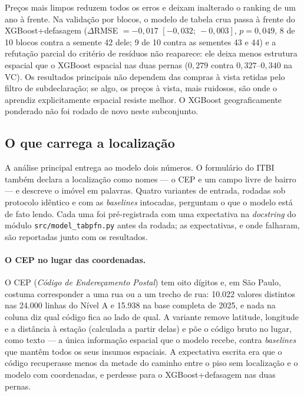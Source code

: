 \documentclass[11pt,a4paper]{article}
\begin{document}
Preços mais limpos reduzem todos os erros e deixam inalterado o ranking de um ano à frente. Na
validação por blocos, o modelo de tabela crua passa à frente do XGBoost+defasagem ($\Delta$RMSE
$= -0{,}017$ $[-0{,}032;\ -0{,}003]$, $p = 0{,}049$, 8 de 10 blocos contra a semente 42 dele;
9 de 10 contra as sementes 43 e 44) e a refutação parcial do critério de resíduos não
reaparece: ele deixa menos estrutura espacial que o XGBoost espacial nas duas pernas ($0{,}279$
contra $0{,}327$--$0{,}340$ na VC). Os resultados principais não dependem das compras à vista
retidas pelo filtro de subdeclaração; se algo, os preços à vista, mais ruidosos, são onde o aprendiz explicitamente espacial resiste melhor. O XGBoost geograficamente ponderado não foi rodado
de novo neste subconjunto.

\subsection{O que carrega a localização}
\label{sec:carriers}

A análise principal entrega ao modelo dois números. O formulário do ITBI também declara a
localização como nomes --- o CEP e um campo livre de bairro --- e descreve o imóvel em
palavras. Quatro variantes de entrada, rodadas sob protocolo idêntico e com as
\emph{baselines} intocadas, perguntam o que o modelo está de fato lendo. Cada uma foi
pré-registrada com uma expectativa na \emph{docstring} do módulo
\texttt{src/model\_tabpfn.py} antes da rodada; as expectativas, e onde falharam, são reportadas
junto com os resultados.

\paragraph{O CEP no lugar das coordenadas.} O CEP (\emph{Código de Endereçamento Postal}) tem
oito dígitos e, em São Paulo, costuma corresponder a uma rua ou a um trecho de rua: 10.022
valores distintos nas 24.000 linhas do Nível A e 15.938 na base completa de 2025, e nada na
coluna diz qual código fica ao lado de qual. A variante remove latitude, longitude e a
distância à estação (calculada a partir delas) e põe o código bruto no lugar, como texto --- a
única informação espacial que o modelo recebe, contra \emph{baselines} que mantêm todos os seus
insumos espaciais. A expectativa escrita era que o código recuperasse menos da metade do
caminho entre o piso sem localização e o modelo com coordenadas, e perdesse para o
XGBoost+defasagem nas duas pernas.
\end{document}

